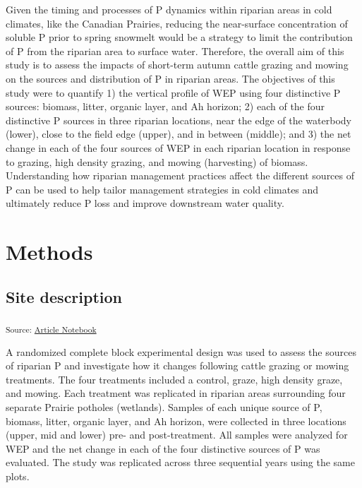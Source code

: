 \documentclass[
]{agujournal2019}
\begin{document}
Given the timing and processes of P dynamics within riparian areas in
cold climates, like the Canadian Prairies, reducing the near-surface
concentration of soluble P prior to spring snowmelt would be a strategy
to limit the contribution of P from the riparian area to surface water.
Therefore, the overall aim of this study is to assess the impacts of
short-term autumn cattle grazing and mowing on the sources and
distribution of P in riparian areas. The objectives of this study were
to quantify 1) the vertical profile of WEP using four distinctive P
sources: biomass, litter, organic layer, and Ah horizon; 2) each of the
four distinctive P sources in three riparian locations, near the edge of
the waterbody (lower), close to the field edge (upper), and in between
(middle); and 3) the net change in each of the four sources of WEP in
each riparian location in response to grazing, high density grazing, and
mowing (harvesting) of biomass. Understanding how riparian management
practices affect the different sources of P can be used to help tailor
management strategies in cold climates and ultimately reduce P loss and
improve downstream water quality.

\section{Methods}\label{methods}

\subsection{Site description}\label{site-description}

\textsubscript{Source:
\href{https://alex-koiter.github.io/riparian-grazing-manuscript/index.qmd.html}{Article
Notebook}}

A randomized complete block experimental design was used to assess the
sources of riparian P and investigate how it changes following cattle
grazing or mowing treatments. The four treatments included a control,
graze, high density graze, and mowing. Each treatment was replicated in
riparian areas surrounding four separate Prairie potholes (wetlands).
Samples of each unique source of P, biomass, litter, organic layer, and
Ah horizon, were collected in three locations (upper, mid and lower)
pre- and post-treatment. All samples were analyzed for WEP and the net
change in each of the four distinctive sources of P was evaluated. The
study was replicated across three sequential years using the same plots.
\end{document}
